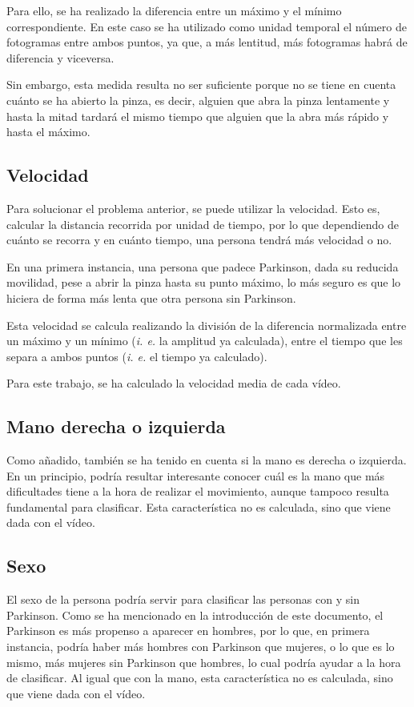 Para ello, se ha realizado la diferencia entre un máximo y el mínimo correspondiente. En este caso se ha utilizado como unidad temporal el número de fotogramas entre ambos puntos, ya que, a más lentitud, más fotogramas habrá de diferencia y viceversa.

Sin embargo, esta medida resulta no ser suficiente porque no se tiene en cuenta cuánto se ha abierto la pinza, es decir, alguien que abra la pinza lentamente y hasta la mitad tardará el mismo tiempo que alguien que la abra más rápido y hasta el máximo.

\subsection{Velocidad}
Para solucionar el problema anterior, se puede utilizar la velocidad. Esto es, calcular la distancia recorrida por unidad de tiempo, por lo que dependiendo de cuánto se recorra y en cuánto tiempo, una persona tendrá más velocidad o no.

En una primera instancia, una persona que padece Parkinson, dada su reducida movilidad, pese a abrir la pinza hasta su punto máximo, lo más seguro es que lo hiciera de forma más lenta que otra persona sin Parkinson.

Esta velocidad se calcula realizando la división de la diferencia normalizada entre un máximo y un mínimo (\textit{i. e.} la amplitud ya calculada), entre el tiempo que les separa a ambos puntos (\textit{i. e.} el tiempo ya calculado).

Para este trabajo, se ha calculado la velocidad media de cada vídeo.

\subsection{Mano derecha o izquierda}
Como añadido, también se ha tenido en cuenta si la mano es derecha o izquierda. En un principio, podría resultar interesante conocer cuál es la mano que más dificultades tiene a la hora de realizar el movimiento, aunque tampoco resulta fundamental para clasificar. Esta característica no es calculada, sino que viene dada con el vídeo.

\subsection{Sexo}
El sexo de la persona podría servir para clasificar las personas con y sin Parkinson. Como se ha mencionado en la introducción de este documento, el Parkinson es más propenso a aparecer en hombres, por lo que, en primera instancia, podría haber más hombres con Parkinson que mujeres, o lo que es lo mismo, más mujeres sin Parkinson que hombres, lo cual podría ayudar a la hora de clasificar. Al igual que con la mano, esta característica no es calculada, sino que viene dada con el vídeo.


